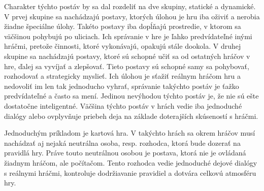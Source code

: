 \documentclass[10pt,twoside,slovak,a4paper]{article}
\begin{document}
\quad Charakter týchto postáv by sa dal rozdeliť na dve skupiny, statické a dynamické. V prvej skupine sa nachádzajú postavy, ktorých úlohou je hru iba oživiť a nerobia žiadne špeciálne úlohy. Takéto postavy iba dopĺňajú prostredie, v ktorom sa väčšinou pohybujú po uliciach. Ich správanie v hre je ľahko predvídateľné inými hráčmi, pretože činnosti, ktoré vykonávajú, opakujú stále dookola. V druhej skupine sa nachádzajú postavy, ktoré sú schopné učiť sa od ostatných hráčov v hre, ďalej sa vyvíjať a zlepšovať. \cite{hernaAI} Tieto postavy sú schopné samy sa pohybovať, rozhodovať a strategicky myslieť. \cite{rozhod} Ich úlohou je sťažiť reálnym hráčom hru a nedovoliť im len tak jednoducho vyhrať, správanie takýchto postáv je ťažko predvídateľné a často sa mení. Jedinou nevýhodou týchto postáv je, že nie sú ešte dostatočne inteligentné. Väčšina týchto postáv v hrách vedie iba jednoduché dialógy alebo ovplyvňuje priebeh deja na základe doterajších skúseností s hráčmi. 

\quad Jednoduchým príkladom je kartová hra. V takýchto hrách sa okrem hráčov musí nachádzať aj nejaká neutrálna osoba, resp. rozhodca, ktorá bude dozerať na pravidlá hry. Práve touto neutrálnou osobou je postava, ktorá nie je ovládaná žiadnym hráčom, ale počítačom. Tento rozhodca vedie jednoduché dejové dialógy s reálnymi hráčmi, kontroluje dodržiavanie pravidiel a dotvára celkovú atmosféru hry. ~\cite{NPC, AI} 
\begin{figure}[tbh]
\centering
\end{figure}
\end{document}
